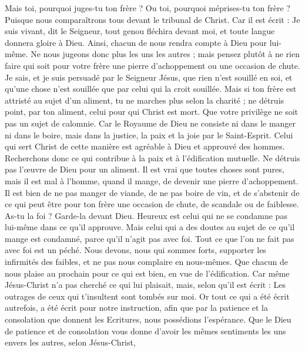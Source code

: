 \begin{multicols}{2}
Mais toi, pourquoi juges-tu ton frère ? Ou toi, pourquoi méprises-tu ton frère ? Puisque nous comparaîtrons tous devant le tribunal de Christ.
Car il est écrit : Je suis vivant, dit le Seigneur, tout genou fléchira devant moi, et toute langue donnera gloire à Dieu.
 Ainsi, chacun de nous rendra compte à Dieu pour lui-même.
Ne nous jugeons donc plus les uns les autres ; mais pensez plutôt à ne rien faire qui soit pour votre frère une pierre d’achoppement ou une occasion de chute.
Je sais, et je suis persuadé par le Seigneur Jésus, que rien n'est souillé en soi, et qu’une chose n’est souillée que par celui qui la croit souillée.
Mais si ton frère est attristé au sujet d’un aliment, tu ne marches plus selon la charité ; ne détruis point, par ton aliment, celui pour qui Christ est mort.
Que votre privilège ne soit pas un sujet de calomnie.
Car le Royaume de Dieu ne consiste ni dans le manger ni dans le boire, mais dans la justice, la paix et la joie par le Saint-Esprit.
Celui qui sert Christ de cette manière est agréable à Dieu et approuvé des hommes.
Recherchons donc ce qui contribue à la paix et à l’édification mutuelle.
Ne détruis pas l’œuvre de Dieu pour un aliment. Il est vrai que toutes choses sont pures, mais il est mal à l’homme, quand il mange, de devenir une pierre d’achoppement.
Il est bien de ne pas manger de viande, de ne pas boire de vin, et de s’abstenir de ce qui peut être pour ton frère une occasion de chute, de scandale ou de faiblesse.
As-tu la foi ? Garde-la devant Dieu. Heureux est celui qui ne se condamne pas lui-même dans ce qu'il approuve.
Mais celui qui a des doutes au sujet de ce qu’il mange est condamné, parce qu’il n’agit pas avec foi. Tout ce que l’on ne fait pas avec foi est un péché.
\VerseOne{}Nous devons, nous qui sommes forts, supporter les infirmités des faibles, et ne pas nous complaire en nous-mêmes.
Que chacun de nous plaise au prochain pour ce qui est bien, en vue de l’édification.
Car même Jésus-Christ n'a pas cherché ce qui lui plaisait, mais, selon qu’il est écrit : Les outrages de ceux qui t’insultent sont tombés sur moi.
Or tout ce qui a été écrit autrefois, a été écrit pour notre instruction, afin que par la patience et la consolation que donnent les Ecritures, nous possédions l’espérance.
Que le Dieu de patience et de consolation vous donne d’avoir les mêmes sentiments les uns envers les autres, selon Jésus-Christ,

\end{multicols}
